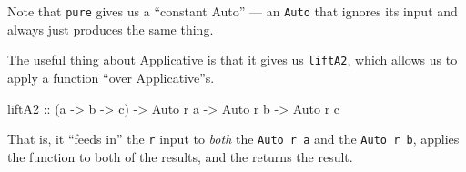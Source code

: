 \documentclass[]{article}
\newenvironment{Shaded}{}{}
\newcommand{\CommentTok}[1]{\textcolor[rgb]{0.38,0.63,0.69}{\textit{#1}}}
\newcommand{\DataTypeTok}[1]{\textcolor[rgb]{0.56,0.13,0.00}{#1}}
\newcommand{\FunctionTok}[1]{\textcolor[rgb]{0.02,0.16,0.49}{#1}}
\newcommand{\KeywordTok}[1]{\textcolor[rgb]{0.00,0.44,0.13}{\textbf{#1}}}
\newcommand{\NormalTok}[1]{#1}
\newcommand{\OperatorTok}[1]{\textcolor[rgb]{0.40,0.40,0.40}{#1}}
\newcommand{\OtherTok}[1]{\textcolor[rgb]{0.00,0.44,0.13}{#1}}
\begin{document}
\begin{Shaded}
\end{Shaded}

Note that \texttt{pure} gives us a ``constant Auto'' --- an \texttt{Auto} that
ignores its input and always just produces the same thing.

The useful thing about Applicative is that it gives us \texttt{liftA2}, which
allows us to apply a function ``over Applicative''s.

\begin{Shaded}
\begin{Highlighting}[]
\OtherTok{liftA2 ::}\NormalTok{ (a }\OtherTok{{-}>}\NormalTok{ b }\OtherTok{{-}>}\NormalTok{ c) }\OtherTok{{-}>} \DataTypeTok{Auto}\NormalTok{ r a }\OtherTok{{-}>} \DataTypeTok{Auto}\NormalTok{ r b }\OtherTok{{-}>} \DataTypeTok{Auto}\NormalTok{ r c}
\end{Highlighting}
\end{Shaded}

That is, it ``feeds in'' the \texttt{r} input to \emph{both} the
\texttt{Auto\ r\ a} and the \texttt{Auto\ r\ b}, applies the function to both of
the results, and the returns the result.
\end{document}
